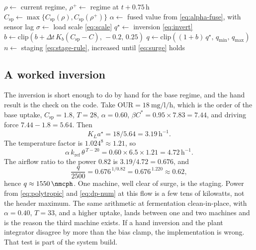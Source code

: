 \begin{algorithm}[ht]
\caption{Deployed schedule-aware fan step}
\label{alg:deployed}
$\rho \leftarrow$ current regime, $\rho^{+} \leftarrow$ regime at $t+0.75\,\mathrm{h}$\;
$C_{\mathrm{sp}} \leftarrow \max\{C_{\mathrm{sp}}(\rho), C_{\mathrm{sp}}(\rho^{+})\}$\;
$\alpha \leftarrow$ fused value from \eqref{eq:alpha-fuse}, with sensor lag\;
$\sigma \leftarrow$ load scale \eqref{eq:scale}\;
$q^{\star} \leftarrow$ inversion \eqref{eq:invert}\;
$b \leftarrow \mathrm{clip}(b + \Delta t\, K_{b}(C_{\mathrm{sp}}-C),\,-0.2,\,0.25)$\;
$q \leftarrow \mathrm{clip}((1+b)\,q^{\star},\, q_{\min},\, q_{\max})$\;
$n \leftarrow$ staging \eqref{eq:stage-rule}, increased until \eqref{eq:surge} holds\;
\;
\end{algorithm}

\subsection{A worked inversion}

The inversion is short enough to do by hand for the base regime, and the hand result is the check on the code. Take $\mathrm{OUR}=\SI{18}{\milli\gram\per\litre\per\hour}$, which is the order of the base uptake, $C_{\mathrm{sp}}=1.8$, $T=28$, $\alpha=0.60$, $\beta C^{*}=0.95\times 7.83=7.44$, and driving force $7.44-1.8=5.64$. Then
\begin{equation}
K_La^{\star}
=
18/5.64
=
3.19\,\mathrm{h^{-1}}.
\end{equation}
The temperature factor is $1.024^{8}\approx 1.21$, so
\begin{equation}
\alpha\,k_{\mathrm{ref}}\,\theta^{\,T-20}
=
0.60\times 6.5\times 1.21
=
4.72\,\mathrm{h^{-1}}.
\end{equation}
The airflow ratio to the power $0.82$ is $3.19/4.72=0.676$, and
\begin{equation}
\frac{q}{2500}
=
0.676^{\,1/0.82}
=
0.676^{\,1.220}
\approx
0.62,
\end{equation}
hence $q\approx\SI{1550}{\nmcph}$. One machine, well clear of surge, is the staging. Power from \eqref{eq:polytropic} and \eqref{eq:dp-num} at this flow is a few tens of kilowatts, not the header maximum. The same arithmetic at fermentation clean-in-place, with $\alpha=0.40$, $T=33$, and a higher uptake, lands between one and two machines and is the reason the third machine exists. If a hand inversion and the plant integrator disagree by more than the bias clamp, the implementation is wrong. That test is part of the system build.

